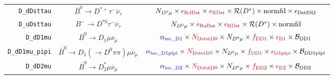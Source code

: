 \begin{landscape}
\begin{table}
\begin{tabular}{r|c|c}
      \texttt{D\_dDsttau} &            $\overline{B}^0 \rightarrow D^{*+} \tau^- \overline{\nu}_\tau$            &                                                                                              $N_{D^0 \mu} \times \textcolor{red}{\epsilon_\text{RdDst}} \times \textcolor{red}{\epsilon_\text{RDst}} \times \mathcal{R}(D^*) \times \text{normfd} \times \epsilon_\text{DstISO}$                                                                                              \\
      \texttt{D\_uDsttau} &                 $B^- \rightarrow D^{*0} \tau^- \overline{\nu}_\tau$                  &                                                                                                             $N_{D^0 \mu} \times \textcolor{red}{\epsilon_\text{RuDst}} \times \textcolor{red}{\epsilon_\text{RDst}} \times \mathcal{R}(D^*) \times \text{normfd}$                                                                                                             \\
        \texttt{D\_dD1mu} &               $\overline{B}^0 \rightarrow D_1 \mu \overline{\nu}_\mu$                &                                                                              $\textcolor{blue}{\alpha_\text{iso\_D1}} \times \textcolor{red}{N_\text{DststD0}} \times N_{D^0 \mu} \times \textcolor{red}{f_\text{DD1}} \times \textcolor{red}{\epsilon_\text{D1}} \times \mathcal{B}_\text{DD1}$                                                                              \\
  \texttt{D\_dD1mu\_pipi} &   $\overline{B}^0 \rightarrow D_1 (\rightarrow D^0 \pi\pi) \mu \overline{\nu}_\mu$   &                                                                        $\textcolor{blue}{\alpha_\text{iso\_D1pipi}} \times \textcolor{red}{N_\text{DststD0}} \times N_{D^0 \mu} \times \textcolor{red}{f_\text{DD1}} \times \textcolor{red}{\epsilon_\text{D1pipi}} \times \mathcal{B}_\text{DD1pipi}$                                                                        \\
        \texttt{D\_dD2mu} &              $\overline{B}^0 \rightarrow D^*_2 \mu \overline{\nu}_\mu$               &                                                                              $\textcolor{blue}{\alpha_\text{iso\_D2}} \times \textcolor{red}{N_\text{DststD0}} \times N_{D^0 \mu} \times \textcolor{red}{f_\text{DD2}} \times \textcolor{red}{\epsilon_\text{D2}} \times \mathcal{B}_\text{DD2}$                                                                              \\

\end{tabular}
\end{table}
\end{landscape}
